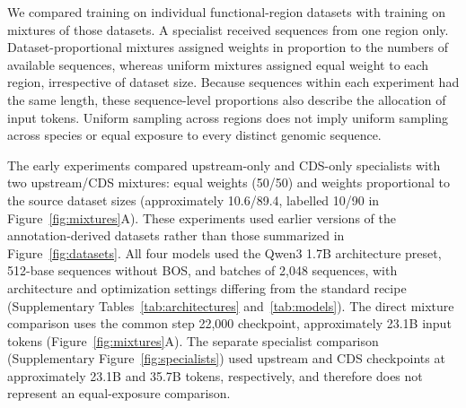 \documentclass[a4paper,num-refs]{oup-contemporary}
\begin{document}
We compared training on individual functional-region datasets with
training on mixtures of those datasets. A specialist received sequences
from one region only. Dataset-proportional mixtures assigned weights in
proportion to the numbers of available sequences, whereas uniform mixtures
assigned equal weight to each region, irrespective of dataset size.
Because sequences within each experiment had the same length, these
sequence-level proportions also describe the allocation of input tokens.
Uniform sampling across regions does not imply uniform sampling across
species or equal exposure to every distinct genomic sequence.



The early experiments compared upstream-only and CDS-only specialists
with two upstream/CDS mixtures: equal weights (50/50) and weights
proportional to the source dataset sizes (approximately 10.6/89.4,
labelled 10/90 in Figure~\ref{fig:mixtures}A).
These experiments used earlier versions of the annotation-derived
datasets rather than those summarized in Figure~\ref{fig:datasets}.
All four models used the Qwen3 1.7B architecture preset, 512-base
sequences without BOS, and batches of 2,048 sequences, with architecture
and optimization settings differing from the standard recipe
(Supplementary Tables~\ref{tab:architectures} and~\ref{tab:models}).
The direct mixture comparison uses the common step 22,000 checkpoint,
approximately 23.1B input tokens (Figure~\ref{fig:mixtures}A).
The separate specialist comparison (Supplementary
Figure~\ref{fig:specialists}) used upstream and CDS checkpoints at
approximately 23.1B and 35.7B tokens, respectively, and therefore
does not represent an equal-exposure comparison.
\end{document}
